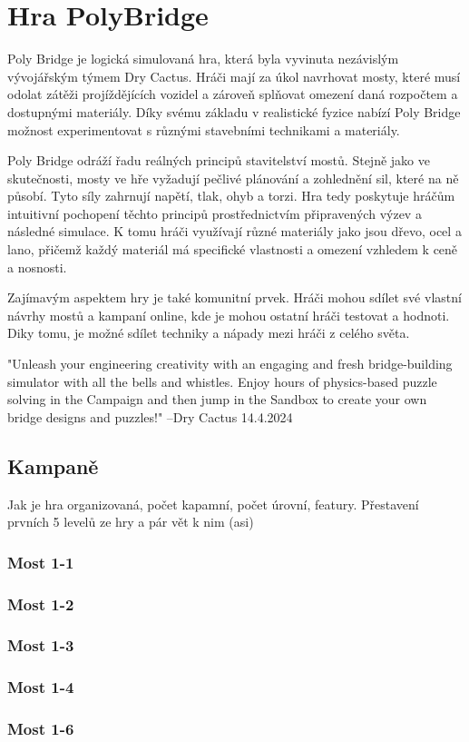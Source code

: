 \chapter{Hra PolyBridge}

Poly Bridge je logická simulovaná hra, která byla vyvinuta nezávislým vývojářským týmem Dry Cactus. Hráči mají za úkol navrhovat mosty, které musí odolat zátěži projíždějících vozidel a zároveň splňovat omezení daná rozpočtem a dostupnými materiály. Díky svému základu v realistické fyzice nabízí Poly Bridge možnost experimentovat s různými stavebními technikami a materiály.

Poly Bridge odráží řadu reálných principů stavitelství mostů. Stejně jako ve skutečnosti, mosty ve hře vyžadují pečlivé plánování a zohlednění sil, které na ně působí. Tyto síly zahrnují napětí, tlak, ohyb a torzi. Hra tedy poskytuje hráčům intuitivní pochopení těchto principů prostřednictvím připravených výzev a následné simulace. K tomu hráči využívají různé materiály jako jsou dřevo, ocel a lano, přičemž každý materiál má specifické vlastnosti a omezení vzhledem k ceně a nosnosti.

Zajímavým aspektem hry je také komunitní prvek. Hráči mohou sdílet své vlastní návrhy mostů a kampaní online, kde je mohou ostatní hráči testovat a hodnoti. Diky tomu, je možné sdílet techniky a nápady mezi hráči z celého světa. 

"Unleash your engineering creativity with an engaging and fresh bridge-building simulator with all the bells and whistles. Enjoy hours of physics-based puzzle solving in the Campaign and then jump in the Sandbox to create your own bridge designs and puzzles!" --Dry Cactus 14.4.2024

\section{Kampaně}

Jak je hra organizovaná, počet kapamní, počet úrovní, featury. Přestavení prvních 5 levelů ze hry a pár vět k nim (asi)
\subsection{Most 1-1}
\subsection{Most 1-2}
\subsection{Most 1-3}
\subsection{Most 1-4}
\subsection{Most 1-6}
